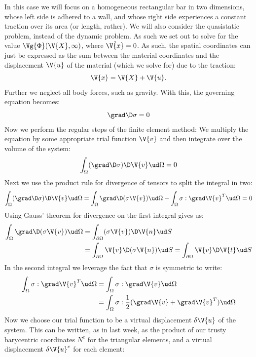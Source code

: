 \documentclass[sigconf]{acmart}
\begin{document}
In this case we will focus on a homogeneous rectangular bar in two dimensions, whose left side is adhered to a wall, and whose right side experiences a constant traction over its area (or length, rather). We will also consider the quasistatic problem, instead of the dynamic problem. As such we set out to solve for the value $ \Vg{\Phi}(\V{X}, \infty) $, where $ \ddot{\V{x}}=0 $. As such, the spatial coordinates can just be expressed as the sum between the material coordinates and the displacement $ \V{u} $ of the material (which we solve for) due to the traction:
\begin{equation}\label{key}
	\V{x} = \V{X} + \V{u}.
\end{equation}
Further we neglect all body forces, such as gravity. With this, the governing equation becomes:
\begin{equation}
	\grad \D \sigma = 0
\end{equation}
Now we perform the regular steps of the finite element method: We multiply the equation by some appropriate trial function $ \V{v} $ and then integrate over the volume of the system:
\begin{equation}
	\int_{\Omega} (\grad \D \sigma) \D \V{v} \ud \Omega = 0
\end{equation}
Next we use the product rule for divergence of tensors to split the integral in two:
\begin{align*}
	\int_{\Omega} (\grad \D \sigma) \D \V{v} \ud \Omega = \int_{\Omega} \grad \D (\sigma \V{v}) \ud \Omega - \int_{\Omega} \sigma : \grad \V{v}^T \ud \Omega = 0
\end{align*}
Using Gauss' theorem for divergence on the first integral gives us:
\begin{align}
	\int_{\Omega} \grad \D (\sigma \V{v}) \ud \Omega &= \int_{\partial \Omega} (\sigma \V{v}) \D \V{n} \ud S\nonumber \\
	&= \int_{\partial \Omega} \V{v} \D (\sigma \V{n}) \ud S = \int_{\partial \Omega} \V{v} \D \V{t} \ud S \label{eq:boundary}
\end{align}
In the second integral we leverage the fact that $ \sigma $ is symmetric to write:
\begin{align}
	\int_{\Omega} \sigma : \grad \V{v}^T \ud \Omega &= \int_{\Omega} \sigma : \grad \V{v} \ud \Omega \nonumber\\
	&= \int_{\Omega} \sigma : \frac{1}{2} (\grad \V{v} + \grad \V{v}^T) \ud \Omega \label{eq:euler_strain_1}
\end{align}
Now we choose our trial function to be a virtual displacement $ \delta \V{u} $ of the system.  This can be written, as in last week, as the product of our trusty barycentric coordinates $ N^e $ for the triangular elements, and a virtual displacement $ \delta\V{u}^e $ for each element:
\end{document}
